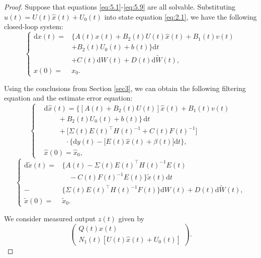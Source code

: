 \documentclass[lettersize,journal]{IEEEtran}
\theoremstyle{plain}
\theoremstyle{definition}
\begin{document}
\begin{proof}
	Suppose that equations \eqref{eq:5.1}-\eqref{eq:5.9} are all solvable. Substituting $u(t) = U(t)\widehat{x}(t) + U_0(t)$ into state equation \eqref{eq:2.1}, we have the following closed-loop system:
	\begin{equation*}
		\left\{
		\begin{aligned}
			\mathrm{d}x(t) =& \Big\{ A(t)x(t) + B_2(t)U(t)\widehat{x}(t) + B_1(t)v(t) \\
			& + B_2(t)U_0(t) + b(t) \Big\} \mathrm{d}t \\
			& + C(t)\mathrm{d}W(t) + D(t)\mathrm{d}\widetilde{W}(t),\\
			x(0)=&x_0.
		\end{aligned}
		\right.
	\end{equation*}
	
	Using the conclusions from Section \ref{sec3}, we can obtain the following filtering equation and the estimate error equation:
	\begin{equation}\label{eq:5.13}
		\left\{
		\begin{aligned}
			&\mathrm{d}\widehat{x}(t) = \Big\{[A(t) + B_2(t)U(t)]\widehat{x}(t) + B_1(t)v(t) \\
			&\qquad + B_2(t)U_0(t) + b(t)\Big\}\,\mathrm{d}t \\
			&\qquad + \big[\Sigma(t)E(t)^{\top}H(t)^{-1} + C(t)F(t)^{-1}\big] \\
			&\qquad\quad \cdot \big\{\mathrm{d}y(t) - \big[E(t)\widehat{x}(t) + \beta(t)\big]\mathrm{d}t\big\},\\
			&\widehat{x}(0) = \widehat{x}_0,
		\end{aligned}
		\right.
	\end{equation}
	\begin{equation}\label{eq:5.14}
		\left\{
		\begin{aligned}
			\mathrm{d}\widetilde{x}(t) =& \Big\{A(t) - \Sigma(t)E(t)^{\top}H(t)^{-1}E(t) \\
			&\quad - C(t)F(t)^{-1}E(t)\Big\}\widetilde{x}(t)\mathrm{d}t\\
			-& \Big\{\Sigma(t)E(t)^{\top}H(t)^{-1}F(t)\Big\}\mathrm{d}W(t) + D(t)\mathrm{d}\widetilde{W}(t),\\
			\widetilde{x}(0) = &\widetilde{x}_0.
		\end{aligned}
		\right.
	\end{equation}
	
	We consider measured output $z(t)$ given by
	\begin{equation*}
		\begin{pmatrix}
			Q(t)x(t)\\
			N_1(t)[U(t)\widehat{x}(t) + U_0(t)]
		\end{pmatrix}.
	\end{equation*} 
	

\end{proof}
\end{document}
